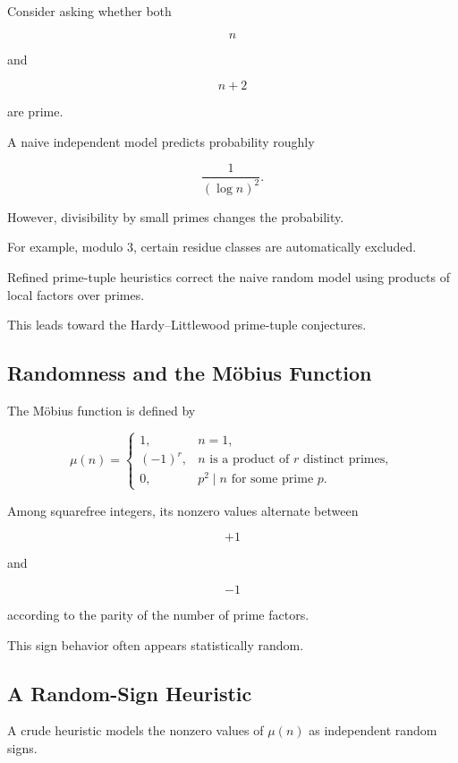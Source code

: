 Consider asking whether both

\[ n \]

and

\[ n+2 \]

are prime.

A naive independent model predicts probability roughly

\[ \frac1{(\log n)^2}. \]

However, divisibility by small primes changes the probability.

For example, modulo \(3\), certain residue classes are automatically
excluded.

Refined prime-tuple heuristics correct the naive random model using products
of local factors over primes.

This leads toward the Hardy--Littlewood prime-tuple conjectures.

\subsection{Randomness and the Möbius Function}
\label{subsec:mobius-randomness}

The Möbius function is defined by

\[
\mu(n)=
\begin{cases}
1, & n=1,\\
(-1)^r, & n\text{ is a product of }r\text{ distinct primes},\\
0, & p^2\mid n\text{ for some prime }p.
\end{cases}
\]

Among squarefree integers, its nonzero values alternate between

\[ +1 \]

and

\[ -1 \]

according to the parity of the number of prime factors.

This sign behavior often appears statistically random.

\subsection{A Random-Sign Heuristic}
\label{subsec:mobius-random-sign}

A crude heuristic models the nonzero values of \(\mu(n)\) as independent
random signs.


